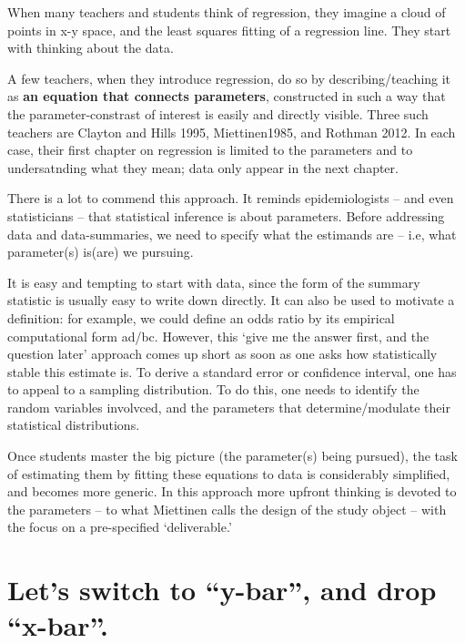 \documentclass[]{book}
\begin{document}
When many teachers and students think of regression, they imagine a cloud of points in x-y space, and the least squares fitting of a regression line. They start with thinking about the data.

A few teachers, when they introduce regression, do so by describing/teaching it as \textbf{an equation that connects parameters}, constructed in such a way that the parameter-constrast of interest is easily and directly visible. Three such teachers are Clayton and Hills 1995, Miettinen1985, and Rothman 2012. In each case, their first chapter on regression is limited to the parameters and to undersatnding what they mean; data only appear in the next chapter.

There is a lot to commend this approach. It reminds epidemiologists -- and even statisticians -- that statistical inference is about parameters. Before addressing data and data-summaries, we need to specify what the estimands are -- i.e, what parameter(s) is(are) we pursuing.

It is easy and tempting to start with data, since the form of the summary statistic is usually easy to write down directly. It can also be used to motivate a definition: for example, we could define an odds ratio by its empirical computational form ad/bc. However, this `give me the answer first, and the question later' approach comes up short as soon as one asks how statistically stable this estimate is. To derive a standard error or confidence interval, one has to appeal to a sampling distribution. To do this, one needs to identify the random variables involvced, and the parameters that determine/modulate their statistical distributions.

Once students master the big picture (the parameter(s) being pursued), the task of estimating them by fitting these equations to data is considerably simplified, and becomes more generic. In this approach more upfront thinking is devoted to the parameters -- to what Miettinen calls the design of the study object -- with the focus on a pre-specified `deliverable.'

\hypertarget{lets-switch-to-y-bar-and-drop-x-bar.}{%
\section{Let's switch to ``y-bar'', and drop ``x-bar''.}\label{lets-switch-to-y-bar-and-drop-x-bar.}}
\end{document}
